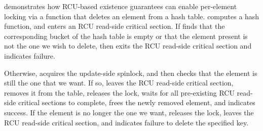 \begin{fcvref}
demonstrates how RCU-based existence guarantees can enable
per-element locking via a function that deletes an element from
a hash table.
 computes a hash function, and  enters an RCU
read-side critical section.
If  finds that the corresponding bucket of the hash table is
empty or that the element present is not the one we wish to delete,
then  exits the RCU read-side critical section and
indicates failure.
\end{fcvref}

\QuickQuizEnd

\begin{fcvref}
Otherwise,  acquires the update-side spinlock, and
 then checks that the element is still the one that we want.
If so,  leaves the RCU read-side critical section,
 removes it from the table,  releases
the lock,  waits for all pre-existing RCU read-side critical
sections to complete,  frees the newly removed element,
and  indicates success.
If the element is no longer the one we want,  releases
the lock,  leaves the RCU read-side critical section,
and  indicates failure to delete the specified key.
\end{fcvref}

